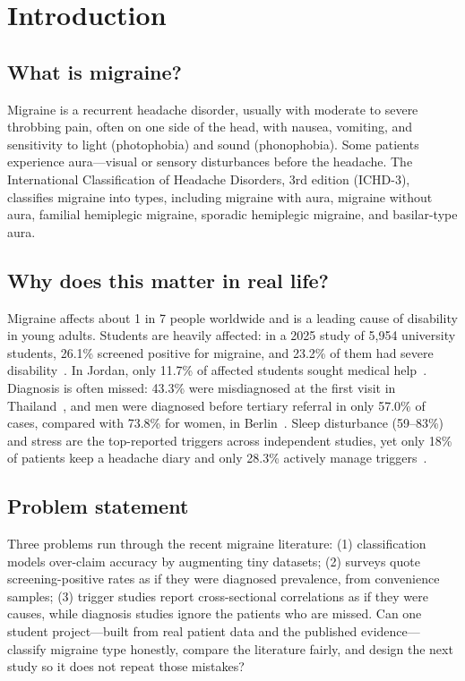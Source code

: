 \documentclass[conference]{IEEEtran}
\begin{document}
\section{Introduction}
\subsection{What is migraine?}
Migraine is a recurrent headache disorder, usually with moderate to severe throbbing pain, often on one side of the head, with nausea, vomiting, and sensitivity to light (photophobia) and sound (phonophobia). Some patients experience aura---visual or sensory disturbances before the headache. The International Classification of Headache Disorders, 3rd edition (ICHD-3), classifies migraine into types, including migraine with aura, migraine without aura, familial hemiplegic migraine, sporadic hemiplegic migraine, and basilar-type aura.

\subsection{Why does this matter in real life?}
Migraine affects about 1 in 7 people worldwide and is a leading cause of disability in young adults. Students are heavily affected: in a 2025 study of 5,954 university students, 26.1\% screened positive for migraine, and 23.2\% of them had severe disability~\cite{samir2025}. In Jordan, only 11.7\% of affected students sought medical help~\cite{almomani2025}. Diagnosis is often missed: 43.3\% were misdiagnosed at the first visit in Thailand~\cite{suwanlaong2025}, and men were diagnosed before tertiary referral in only 57.0\% of cases, compared with 73.8\% for women, in Berlin~\cite{angerhofer2025}. Sleep disturbance (59--83\%) and stress are the top-reported triggers across independent studies, yet only 18\% of patients keep a headache diary and only 28.3\% actively manage triggers~\cite{elmazny2025}.

\subsection{Problem statement}
Three problems run through the recent migraine literature: (1) classification models over-claim accuracy by augmenting tiny datasets; (2) surveys quote screening-positive rates as if they were diagnosed prevalence, from convenience samples; (3) trigger studies report cross-sectional correlations as if they were causes, while diagnosis studies ignore the patients who are missed. Can one student project---built from real patient data and the published evidence---classify migraine type honestly, compare the literature fairly, and design the next study so it does not repeat those mistakes?
\end{document}
